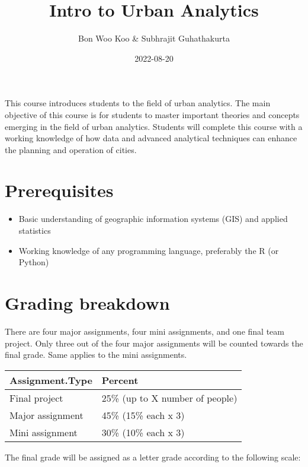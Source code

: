 \documentclass[
]{article}
\title{Intro to Urban Analytics}
\author{Bon Woo Koo \& Subhrajit Guhathakurta}
\date{2022-08-20}
\providecommand{\tightlist}{%
  \setlength{\itemsep}{0pt}\setlength{\parskip}{0pt}}
\begin{document}
\maketitle

This course introduces students to the field of urban analytics. The
main objective of this course is for students to master important
theories and concepts emerging in the field of urban analytics. Students
will complete this course with a working knowledge of how data and
advanced analytical techniques can enhance the planning and operation of
cities.

\hypertarget{prerequisites}{%
\section{Prerequisites}\label{prerequisites}}

\begin{itemize}
\tightlist
\item
  Basic understanding of geographic information systems (GIS) and
  applied statistics
\item
  Working knowledge of any programming language, preferably the R (or
  Python)
\end{itemize}

\hypertarget{grading-breakdown}{%
\section{Grading breakdown}\label{grading-breakdown}}

There are four major assignments, four mini assignments, and one final
team project. Only three out of the four major assignments will be
counted towards the final grade. Same applies to the mini assignments.

\begin{table}
\centering
\begin{tabular}[t]{l|l}
\hline
Assignment.Type & Percent\\
\hline
Final project & 25\% (up to X number of people)\\
\hline
Major assignment & 45\% (15\% each x 3)\\
\hline
Mini assignment & 30\% (10\% each x 3)\\
\hline
\end{tabular}
\end{table}

The final grade will be assigned as a letter grade according to the
following scale:
\end{document}
